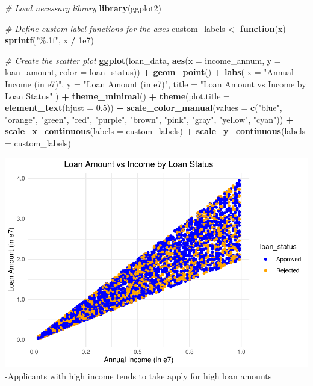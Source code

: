 \documentclass[
]{article}
\newenvironment{Shaded}{\begin{snugshade}}{\end{snugshade}}
\newcommand{\AttributeTok}[1]{\textcolor[rgb]{0.13,0.29,0.53}{#1}}
\newcommand{\CommentTok}[1]{\textcolor[rgb]{0.56,0.35,0.01}{\textit{#1}}}
\newcommand{\ControlFlowTok}[1]{\textcolor[rgb]{0.13,0.29,0.53}{\textbf{#1}}}
\newcommand{\FloatTok}[1]{\textcolor[rgb]{0.00,0.00,0.81}{#1}}
\newcommand{\FunctionTok}[1]{\textcolor[rgb]{0.13,0.29,0.53}{\textbf{#1}}}
\newcommand{\NormalTok}[1]{#1}
\newcommand{\OtherTok}[1]{\textcolor[rgb]{0.56,0.35,0.01}{#1}}
\newcommand{\SpecialCharTok}[1]{\textcolor[rgb]{0.81,0.36,0.00}{\textbf{#1}}}
\newcommand{\StringTok}[1]{\textcolor[rgb]{0.31,0.60,0.02}{#1}}
\begin{document}
\begin{Shaded}
\begin{Highlighting}[]
\CommentTok{\# Load necessary library}
\FunctionTok{library}\NormalTok{(ggplot2)}

\CommentTok{\# Define custom label functions for the axes}
\NormalTok{custom\_labels }\OtherTok{\textless{}{-}} \ControlFlowTok{function}\NormalTok{(x) }\FunctionTok{sprintf}\NormalTok{(}\StringTok{"\%.1f"}\NormalTok{, x }\SpecialCharTok{/} \FloatTok{1e7}\NormalTok{)}

\CommentTok{\# Create the scatter plot}
\FunctionTok{ggplot}\NormalTok{(loan\_data, }\FunctionTok{aes}\NormalTok{(}\AttributeTok{x =}\NormalTok{ income\_annum, }\AttributeTok{y =}\NormalTok{ loan\_amount, }\AttributeTok{color =}\NormalTok{ loan\_status)) }\SpecialCharTok{+}
  \FunctionTok{geom\_point}\NormalTok{() }\SpecialCharTok{+}
  \FunctionTok{labs}\NormalTok{(}
    \AttributeTok{x =} \StringTok{"Annual Income (in e7)"}\NormalTok{,}
    \AttributeTok{y =} \StringTok{"Loan Amount (in e7)"}\NormalTok{,}
    \AttributeTok{title =} \StringTok{"Loan Amount vs Income by Loan Status"}
\NormalTok{  ) }\SpecialCharTok{+}
  \FunctionTok{theme\_minimal}\NormalTok{() }\SpecialCharTok{+}
  \FunctionTok{theme}\NormalTok{(}\AttributeTok{plot.title =} \FunctionTok{element\_text}\NormalTok{(}\AttributeTok{hjust =} \FloatTok{0.5}\NormalTok{)) }\SpecialCharTok{+}
  \FunctionTok{scale\_color\_manual}\NormalTok{(}\AttributeTok{values =} \FunctionTok{c}\NormalTok{(}\StringTok{"blue"}\NormalTok{, }\StringTok{"orange"}\NormalTok{, }\StringTok{"green"}\NormalTok{, }\StringTok{"red"}\NormalTok{, }\StringTok{"purple"}\NormalTok{, }\StringTok{"brown"}\NormalTok{, }\StringTok{"pink"}\NormalTok{, }\StringTok{"gray"}\NormalTok{, }\StringTok{"yellow"}\NormalTok{, }\StringTok{"cyan"}\NormalTok{)) }\SpecialCharTok{+}
  \FunctionTok{scale\_x\_continuous}\NormalTok{(}\AttributeTok{labels =}\NormalTok{ custom\_labels) }\SpecialCharTok{+}
  \FunctionTok{scale\_y\_continuous}\NormalTok{(}\AttributeTok{labels =}\NormalTok{ custom\_labels)}
\end{Highlighting}
\end{Shaded}

\includegraphics{Loan_approval_files/figure-latex/unnamed-chunk-18-1.pdf}
-Applicants with high income tends to take apply for high loan amounts
\end{document}
